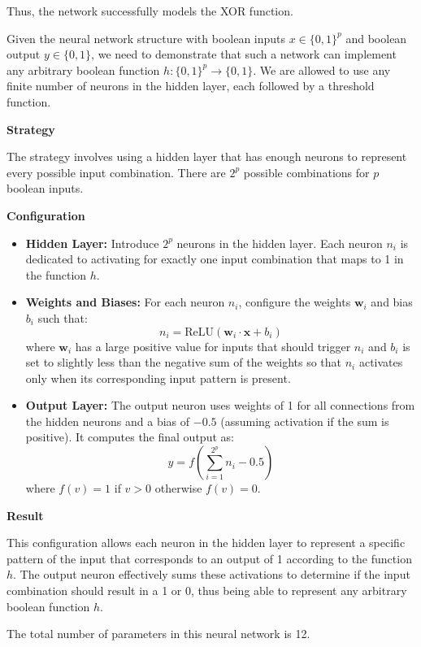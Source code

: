 \documentclass[oneside,solution]{seu-ml-assign}
\begin{document}
Thus, the network successfully models the XOR function.
\subproblem{}

Given the neural network structure with boolean inputs $x \in \{0,1\}^p$ and boolean output $y \in \{0,1\}$, 
we need to demonstrate that such a network can implement any arbitrary boolean function $h:\{0,1\}^p \to \{0,1\}$. 
We are allowed to use any finite number of neurons in the hidden layer, each followed by a threshold function.

\textbf{\large{Strategy}}

The strategy involves using a hidden layer that has enough neurons to represent every possible input combination. 
There are $2^p$ possible combinations for $p$ boolean inputs.

\textbf{\large{Configuration}}
\begin{itemize}
  \item \textbf{Hidden Layer:} Introduce $2^p$ neurons in the hidden layer. Each neuron $n_i$ is dedicated to activating for 
  exactly one input combination that maps to 1 in the function $h$.
  \item \textbf{Weights and Biases:} For each neuron $n_i$, configure the weights $\mathbf{w}_i$ and bias $b_i$ such that:
    \begin{equation}
    n_i = \text{ReLU}(\mathbf{w}_i \cdot \mathbf{x} + b_i)
    \end{equation}
    where $\mathbf{w}_i$ has a large positive value for inputs that should trigger $n_i$ and $b_i$ is set to slightly 
    less than the negative sum of the weights so that $n_i$ activates only when its corresponding input pattern is present.
  \item \textbf{Output Layer:} The output neuron uses weights of 1 for all connections from the hidden neurons and a bias of $-0.5$ 
  (assuming activation if the sum is positive). It computes the final output as:
    \begin{equation}
    y = f\left(\sum_{i=1}^{2^p} n_i - 0.5\right)
    \end{equation}
    where $f(v) = 1$ if $v > 0$ otherwise $f(v) = 0$.
\end{itemize}

\textbf{\large{Result}}

This configuration allows each neuron in the hidden layer to represent a specific pattern of the input that corresponds to 
an output of 1 according to the function $h$. The output neuron effectively sums these activations to determine if the input 
combination should result in a 1 or 0, thus being able to represent any arbitrary boolean function $h$.


\subproblem{}

\subproblem{}
\subproblem{}
The total number of parameters in this neural network is 12.


\subproblem{}

\subproblem{}







\vspace{2mm}
\end{document}
